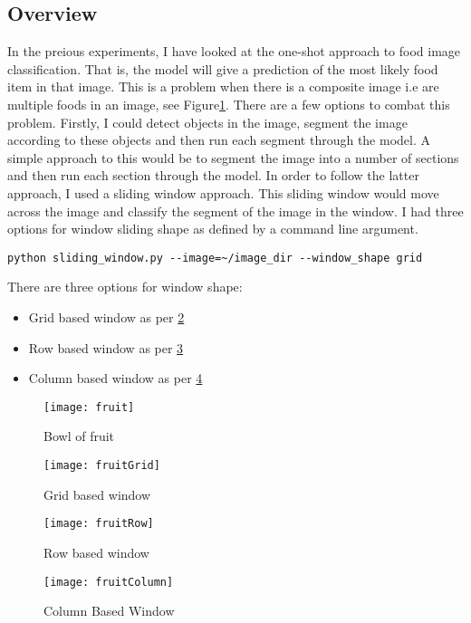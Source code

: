 \subsection*{Overview}
In the preious experiments, I have looked at the one-shot approach to food image
classification. That is, the model will give a prediction of the most likely
food item in that image. This is a problem when there is a composite image i.e are multiple foods in an
image, see Figure\ref{fig:fruit}. There are a few options to combat this problem. Firstly, I could detect
objects in the image, segment the image according to these objects and then run
each segment through the model. A simple approach to this would be to segment
the image into a number of sections and then run each section through the model.
In order to follow the latter approach, I used a sliding window approach. This
sliding window would move across the image and classify the segment of the image
in the window. I had three options for window sliding shape as defined by a
command line argument.

\begin{lstlisting}
python sliding_window.py --image=~/image_dir --window_shape grid
\end{lstlisting}

There are three options for window shape:
\begin{itemize}
	\item{Grid based window as per \ref{fig:fruitGrid}}
	\item{Row based window as per \ref{fig:fruitRow}}
	\item{Column based window as per \ref{fig:fruitColumn}}
\end{itemize}

\begin{figure}
    \texttt{[image: fruit]}
    \caption{Bowl of fruit}
    \label{fig:fruit}
\end{figure}

\begin{figure}
    \texttt{[image: fruitGrid]}
	\caption{Grid based window}
    \label{fig:fruitGrid}
\end{figure}

\begin{figure}
    \texttt{[image: fruitRow]}
    \caption{Row based window}
    \label{fig:fruitRow}
\end{figure}

\begin{figure}
    \texttt{[image: fruitColumn]}
    \caption{Column Based Window}
    \label{fig:fruitColumn}
\end{figure}

